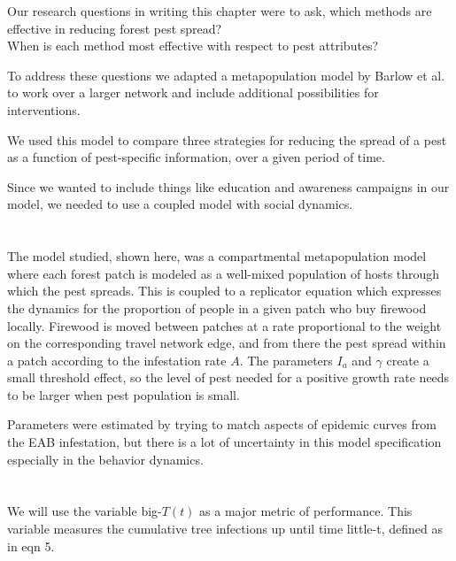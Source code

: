 \documentclass{article}
\begin{document}
Our research questions in writing this chapter were to ask, which methods are effective in reducing forest pest spread? \\
\vspace{0.5cm}
When is each method most effective with respect to pest attributes? 

To address these questions we adapted a metapopulation model by Barlow et al. to work over a larger network and include additional possibilities for interventions.

We used this model to compare three strategies for reducing the spread of a pest as a function of pest-specific information, over a given period of time.

Since we wanted to include things like education and awareness campaigns in our model, we needed to use a coupled model with social dynamics. 

\section{}

The model studied, shown here, was a compartmental metapopulation model where each forest patch is modeled as a well-mixed population of hosts through which the pest spreads. This is coupled to a replicator equation which expresses the dynamics for the proportion of people in a given patch who buy firewood locally. Firewood is moved between patches at a rate proportional to the weight on the corresponding travel network edge, and from there the pest spread within a patch according to the infestation rate $A$. The parameters $I_a$ and $\gamma$ create a small threshold effect, so the level of pest needed for a positive growth rate needs to be larger when pest population is small. 

Parameters were estimated by trying to match aspects of epidemic curves from the EAB infestation, but there is a lot of uncertainty in this model specification especially in the behavior dynamics. 

\section{}

We will use the variable big-$T(t)$ as a major metric of performance. This variable measures the cumulative tree infections up until time little-t, defined as in eqn 5.

\section{}
\end{document}
